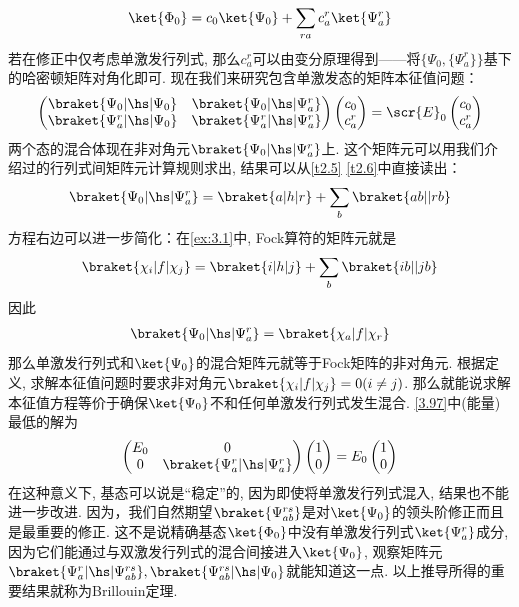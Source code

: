 \begin{align}
	\ket{\Phi_0} = c_0\ket{\Psi_0} + \sum_{ra}c_a^r\ket{\Psi_a^r}
\end{align}
若在修正中仅考虑单激发行列式, 
那么$c_a^r$可以由变分原理得到——将$\{\Psi_0,\{\Psi_a^r\}\}$基下的哈密顿矩阵对角化即可. 
现在我们来研究包含单激发态的矩阵本征值问题：
\begin{align}
	\label{3.97}
	\begin{pmatrix}
		\braket{\Psi_0|\hs|\Psi_0}   & \braket{\Psi_0|\hs|\Psi_a^r}   \\
		\braket{\Psi_a^r|\hs|\Psi_0} & \braket{\Psi_a^r|\hs|\Psi_a^r}
	\end{pmatrix}
	\begin{pmatrix}
		c_0\\
		c_a^r
	\end{pmatrix}
	=\scr{E}_0
	\begin{pmatrix}
		c_0\\
		c_a^r
	\end{pmatrix}
\end{align}
两个态的混合体现在非对角元$\braket{\Psi_0|\hs|\Psi_a^r}$上. 
这个矩阵元可以用我们介绍过的行列式间矩阵元计算规则求出, 
结果可以从\autoref{t2.5} \autoref{t2.6}中直接读出：
\begin{align}
	\braket{\Psi_0|\hs|\Psi_a^r} = \braket{a|h|r} + \sum_b\braket{ab||rb}
\end{align}
方程右边可以进一步简化：在\autoref{ex:3.1}中, 
Fock算符的矩阵元就是
\begin{align}
	\braket{\chi_i|f|\chi_j} = \braket{i|h|j} + \sum_b\braket{ib||jb}
\end{align} 
因此
\begin{align}
	\braket{\Psi_0|\hs|\Psi_a^r} = \braket{\chi_a|f|\chi_r}
\end{align}
那么单激发行列式和$\ket{\Psi_0}$的混合矩阵元就等于Fock矩阵的非对角元.
根据定义, 
求解\hft 本征值问题时要求非对角元$\braket{\chi_i|f|\chi_j}=0(i\neq j)$. 
那么就能说求解\hft 本征值方程等价于确保$\ket{\Psi_0}$不和任何单激发行列式发生混合. 
\autoref{3.97}中(能量)最低的解为
\begin{align}
	\begin{pmatrix}
		E_0 & 0\\
		0   & \braket{\Psi_a^r|\hs|\Psi_a^r}
	\end{pmatrix}
	\begin{pmatrix}
		1\\0
	\end{pmatrix}
	=E_0
	\begin{pmatrix}
		1\\0
	\end{pmatrix}
\end{align}
在这种意义下, 
\hft 基态可以说是“稳定”的, 
因为即使将单激发行列式混入, 
结果也不能进一步改进. 
因为，我们自然期望$\braket{\Psi_{ab}^{rs}}$是对$\ket{\Psi_0}$的领头阶修正而且是最重要的修正. 
这不是说精确基态$\ket{\Phi_0}$中没有单激发行列式$\ket{\Psi_a^r}$成分, 
因为它们能通过与双激发行列式的混合间接进入$\ket{\Psi_0}$, 
观察矩阵元$\braket{\Psi_a^r|\hs|\Psi_{ab}^{rs}},\braket{\Psi_{ab}^{rs}|\hs|\Psi_0}$就能知道这一点. 
以上推导所得的重要结果就称为Brillouin定理. 


